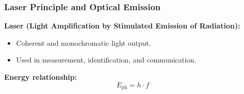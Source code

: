 \begin{frame}
	\frametitle{Laser Principle and Optical Emission}
    \textbf{Laser (Light Amplification by Stimulated Emission of Radiation):}
    \begin{itemize}
        \item Coherent and monochromatic light output.
        \item Used in measurement, identification, and communication.
    \end{itemize}
    \textbf{Energy relationship:}
    \begin{equation}
        E_{\text{ph}} = h \cdot f
    \end{equation}
\end{frame}
